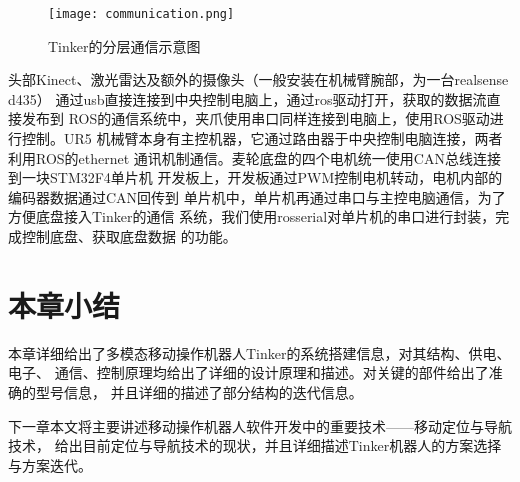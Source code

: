 \begin{figure}[ht] %
  \centering
  \texttt{[image: communication.png]}
  \caption{Tinker的分层通信示意图}
  \label{fig:communication}
\end{figure}

头部Kinect、激光雷达及额外的摄像头（一般安装在机械臂腕部，为一台realsense d435）
通过usb直接连接到中央控制电脑上，通过ros驱动打开，获取的数据流直接发布到
ROS的通信系统中，夹爪使用串口同样连接到电脑上，使用ROS驱动进行控制。UR5
机械臂本身有主控机器，它通过路由器于中央控制电脑连接，两者利用ROS的ethernet
通讯机制通信。麦轮底盘的四个电机统一使用CAN总线连接到一块STM32F4单片机
开发板上，开发板通过PWM控制电机转动，电机内部的编码器数据通过CAN回传到
单片机中，单片机再通过串口与主控电脑通信，为了方便底盘接入Tinker的通信
系统，我们使用rosserial对单片机的串口进行封装，完成控制底盘、获取底盘数据
的功能。


\section{本章小结}

本章详细给出了多模态移动操作机器人Tinker的系统搭建信息，对其结构、供电、电子、
通信、控制原理均给出了详细的设计原理和描述。对关键的部件给出了准确的型号信息，
并且详细的描述了部分结构的迭代信息。

下一章本文将主要讲述移动操作机器人软件开发中的重要技术——移动定位与导航技术，
给出目前定位与导航技术的现状，并且详细描述Tinker机器人的方案选择与方案迭代。










